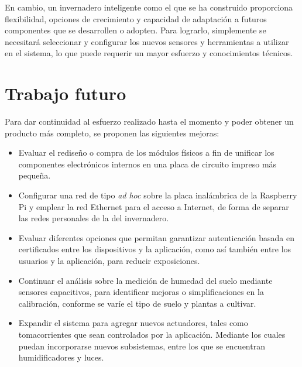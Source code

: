 En cambio, un invernadero inteligente como el que se ha construido proporciona flexibilidad, opciones de crecimiento y capacidad de adaptación a futuros componentes que se desarrollen o adopten. Para lograrlo, simplemente se necesitará seleccionar y configurar los nuevos sensores y herramientas a utilizar en el sistema, lo que puede requerir un mayor esfuerzo y conocimientos técnicos.






\section{Trabajo futuro}

Para dar continuidad al esfuerzo realizado hasta el momento y poder obtener un producto más completo, se proponen las siguientes mejoras:

\begin{itemize}
\item Evaluar el rediseño o compra de los módulos físicos a fin de unificar los componentes electrónicos internos en una placa de circuito impreso más pequeña. %
 
\item Configurar una red de tipo \textit{ad hoc} sobre la placa inalámbrica de la Raspberry Pi y emplear la red Ethernet para el acceso a Internet, de forma de separar las redes personales de la del invernadero.

\item Evaluar diferentes opciones que permitan garantizar autenticación basada en certificados entre los dispositivos y la aplicación, como así también entre los usuarios y la aplicación, para reducir exposiciones.

\item Continuar el análisis sobre la medición de humedad del suelo mediante sensores capacitivos, para identificar mejoras o simplificaciones en la calibración, conforme se varíe el tipo de suelo y plantas a cultivar. 

\item Expandir el sistema para agregar nuevos actuadores, tales como tomacorrientes que sean controlados por la aplicación. Mediante los cuales puedan incorporarse nuevos subsistemas, entre los que se encuentran humidificadores y luces. 

\end{itemize}
